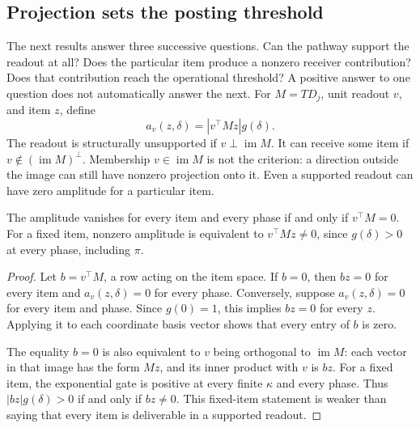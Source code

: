 \documentclass[submission,nolinenumbers]{esj}
\DeclareMathOperator{\im}{im}
\begin{document}
\subsection{Projection sets the posting threshold}
The next results answer three successive questions. Can the pathway support the readout at all? Does the particular item produce a nonzero receiver contribution? Does that contribution reach the operational threshold? A positive answer to one question does not automatically answer the next.\label{sec:projection}
For $M=TD_j$, unit readout $v$, and item $z$, define
\begin{equation}
a_v(z,\delta)=|v^\top Mz|g(\delta).\label{eq:amplitude}
\end{equation}
The readout is structurally unsupported if $v\perp\im M$. It can receive some item if $v\notin(\im M)^\perp$. Membership $v\in\im M$ is not the criterion: a direction outside the image can still have nonzero projection onto it. Even a supported readout can have zero amplitude for a particular item.

\begin{lemma}\label{prop:projection}
The amplitude vanishes for every item and every phase if and only if $v^\top M=0$. For a fixed item, nonzero amplitude is equivalent to $v^\top Mz\ne0$, since $g(\delta)>0$ at every phase, including $\pi$.
\end{lemma}
\begin{proof}
Let $b=v^\top M$, a row acting on the item space. If $b=0$, then $bz=0$ for every item and $a_v(z,\delta)=0$ for every phase. Conversely, suppose $a_v(z,\delta)=0$ for every item and phase. Since $g(0)=1$, this implies $bz=0$ for every $z$. Applying it to each coordinate basis vector shows that every entry of $b$ is zero.

The equality $b=0$ is also equivalent to $v$ being orthogonal to $\im M$: each vector in that image has the form $Mz$, and its inner product with $v$ is $bz$. For a fixed item, the exponential gate is positive at every finite $\kappa$ and every phase. Thus $|bz|g(\delta)>0$ if and only if $bz\ne0$. This fixed-item statement is weaker than saying that every item is deliverable in a supported readout.
\end{proof}
\end{document}
